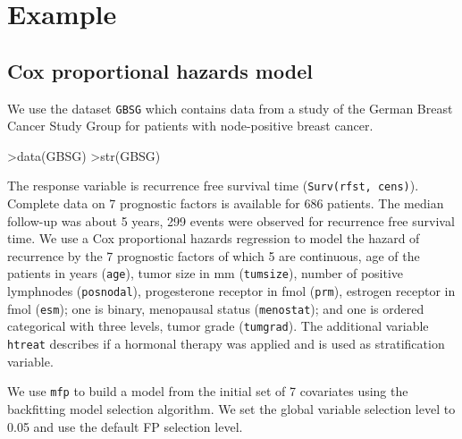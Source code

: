 \documentclass[11pt]{article}
\begin{document}
\section{Example}
\subsection{Cox proportional hazards model}
We use the dataset \texttt{GBSG} which contains data from a study of the German Breast Cancer Study Group for patients with node-positive breast cancer. 
\begin{Schunk}
\begin{Sinput}
>data(GBSG)
>str(GBSG)
\end{Sinput}
\end{Schunk}

The response variable is recurrence free survival time ({\tt Surv(rfst, cens)}). 
Complete data on 7 prognostic factors is available for 686
patients. 
The median follow-up was about 5 years, 299 events were
observed for recurrence free survival time. 
We use a Cox proportional hazards regression to model the hazard of recurrence by the 7 prognostic factors of which 5 are continuous, age of the patients in years ({\tt age}), tumor size in mm 
({\tt tumsize}), number of positive lymphnodes ({\tt posnodal}), progesterone receptor in 
fmol ({\tt prm}), estrogen receptor in fmol ({\tt esm}); one is binary, menopausal status ({\tt menostat}); and one is ordered categorical with three levels, tumor grade ({\tt tumgrad}). The additional variable {\tt htreat} describes if a hormonal therapy  was applied and is used as stratification variable.

We use \texttt{mfp} to build a model from the initial set of 7 covariates using the 
backfitting model selection algorithm. 
We set the global variable selection level to 0.05 and use the default FP selection level. 
\end{document}
